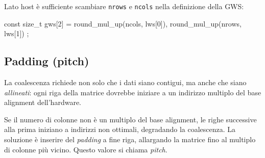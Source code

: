 Lato host è sufficiente scambiare \texttt{nrows} e \texttt{ncols} nella definizione della GWS:

\begin{code}[caption={GWS corretta per coalescenza ottimale}, label={code:matinit_host_inv}]
const size_t gws[2] = { round_mul_up(ncols, lws[0]),
                         round_mul_up(nrows, lws[1]) };
\end{code}

\subsection{Padding (pitch)}

La coalescenza richiede non solo che i dati siano contigui, ma anche che siano \emph{allineati}: ogni riga della matrice dovrebbe iniziare a un indirizzo multiplo del base alignment dell'hardware.

Se il numero di colonne non è un multiplo del base alignment, le righe successive alla prima iniziano a indirizzi non ottimali, degradando la coalescenza. La soluzione è inserire del \emph{padding} a fine riga, allargando la matrice fino al multiplo di colonne più vicino. Questo valore si chiama \emph{pitch}.

